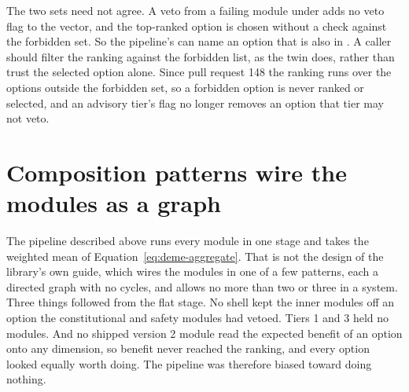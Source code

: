 The two sets need not agree. A veto from a failing module under  adds no veto
flag to the vector, and the top-ranked option is chosen without a check against the forbidden
set. So the pipeline's  can name an option that is also in
. A caller should filter the ranking against the forbidden list, as the
twin does, rather than trust the selected option alone.
Since pull request 148 the ranking runs over the options outside the forbidden set, so
a forbidden option is never ranked or selected, and an advisory tier's flag no longer removes an
option that tier may not veto.

\section{Composition patterns wire the modules as a graph}\label{sec:deme-composition}

The pipeline described above runs every module in one stage and takes the weighted mean of
Equation~\eqref{eq:deme-aggregate}.
That is not the design of the library's own guide, which wires the modules in one of a few
patterns, each a directed graph with no cycles, and allows no more than two or three in a system.
Three things followed from the flat stage.
No shell kept the inner modules off an option the constitutional and safety modules had vetoed.
Tiers 1 and 3 held no modules.
And no shipped version 2 module read the expected benefit of an option onto any dimension, so benefit never
reached the ranking, and every option looked equally worth doing.
The pipeline was therefore biased toward doing nothing.

